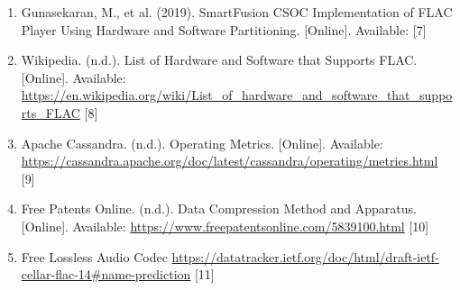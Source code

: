 \documentclass[conference]{IEEEtran}
\begin{document}
\begin{enumerate}
    \item Gunasekaran, M., et al. (2019). SmartFusion CSOC Implementation of FLAC Player Using Hardware and Software Partitioning. [Online]. Available: \href{https://www.microsemi.com/document-portal/doc_view/129825-ac376-smartfusion-csoc-implementation-of-flac-player-using-hardware-and-software-partitioning-app-note} [7]

    \item Wikipedia. (n.d.). List of Hardware and Software that Supports FLAC. [Online]. Available: \url{https://en.wikipedia.org/wiki/List_of_hardware_and_software_that_supports_FLAC} [8]

    \item Apache Cassandra. (n.d.). Operating Metrics. [Online]. Available: \url{https://cassandra.apache.org/doc/latest/cassandra/operating/metrics.html} [9]

    \item Free Patents Online. (n.d.). Data Compression Method and Apparatus. [Online]. Available: \url{https://www.freepatentsonline.com/5839100.html} [10]

    \item Free Lossless Audio Codec \url{https://datatracker.ietf.org/doc/html/draft-ietf-cellar-flac-14#name-prediction} [11]
\end{enumerate}
\end{document}
